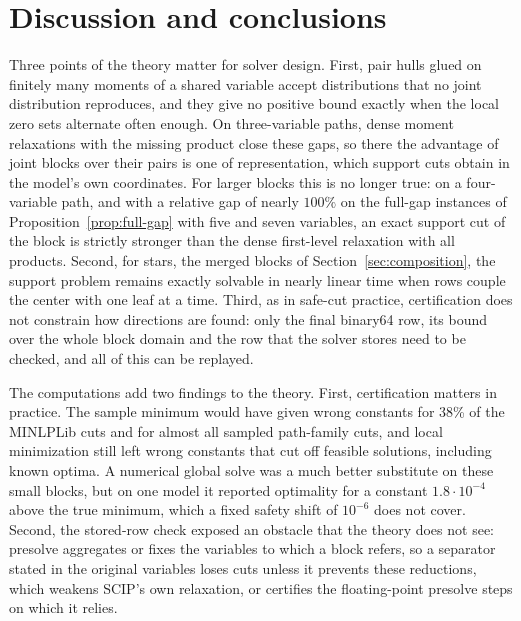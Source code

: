 \section{Discussion and conclusions}\label{sec:conclusions}

Three points of the theory matter for solver design. First, pair hulls glued
on finitely many moments of a shared variable accept distributions that no
joint distribution reproduces, and they give no positive bound exactly when the
local zero sets alternate often enough. On three-variable paths, dense moment
relaxations with the missing product close these gaps, so there the advantage
of joint blocks over their pairs is one of representation, which support cuts
obtain in the model's own coordinates. For larger blocks this is no longer
true: on a four-variable path, and with a relative gap of nearly $100\%$ on the
full-gap instances of Proposition~\ref{prop:full-gap} with five and seven
variables, an exact support cut of the block is strictly stronger than the
dense first-level relaxation with all products. Second, for stars, the merged
blocks of Section~\ref{sec:composition}, the support problem remains exactly
solvable in nearly linear time when rows couple the center with one leaf at a
time. Third, as in safe-cut practice, certification does not constrain how
directions are found: only the final binary64 row, its bound over the whole
block domain and the row that the solver stores need to be checked, and all of
this can be replayed.

The computations add two findings to the theory. First, certification matters
in practice. The sample minimum would have given wrong constants for 38\% of
the MINLPLib cuts and for almost all sampled path-family cuts, and local
minimization still left wrong constants that cut off feasible solutions,
including known optima. A numerical global solve was a much better substitute
on these small blocks, but on one model it reported optimality for a constant
$1.8\cdot10^{-4}$ above the true minimum, which a fixed safety shift of
$10^{-6}$ does not cover. Second, the stored-row check exposed an obstacle that
the theory does not see: presolve aggregates or fixes the variables to which a
block refers, so a separator stated in the original variables loses cuts unless
it prevents these reductions, which weakens SCIP's own relaxation, or
certifies the floating-point presolve steps on which it relies.

